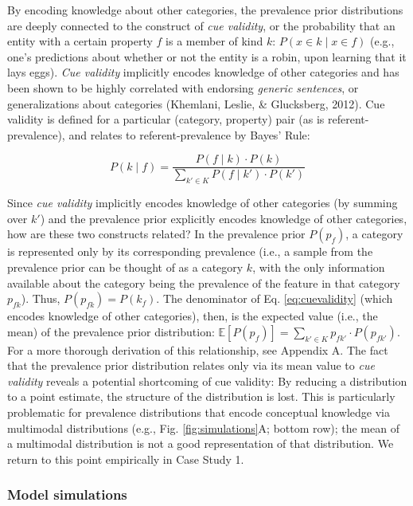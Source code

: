 \documentclass[english,floatsintext,man]{apa6}
\theoremstyle{definition}
\theoremstyle{definition}
\theoremstyle{definition}
\theoremstyle{remark}
\begin{document}
By encoding knowledge about other categories, the prevalence prior
distributions are deeply connected to the construct of \emph{cue
validity}, or the probability that an entity with a certain property
\(f\) is a member of kind \(k\): \(P(x \in k \mid x \in f)\) (e.g.,
one's predictions about whether or not the entity is a robin, upon
learning that it lays eggs). \emph{Cue validity} implicitly encodes
knowledge of other categories and has been shown to be highly correlated
with endorsing \emph{generic sentences}, or generalizations about
categories (Khemlani, Leslie, \& Glucksberg, 2012). Cue validity is
defined for a particular (category, property) pair (as is
referent-prevalence), and relates to referent-prevalence by Bayes' Rule:

\begin{equation}
P( k \mid  f) = \frac{P( f \mid  k) \cdot P( k)}{\sum\limits_{k' \in K} P( f \mid k') \cdot P( k')} \label{eq:cuevalidity}
\end{equation}

Since \emph{cue validity} implicitly encodes knowledge of other
categories (by summing over \(k'\)) and the prevalence prior explicitly
encodes knowledge of other categories, how are these two constructs
related? In the prevalence prior \(P(p_f)\), a category is represented
only by its corresponding prevalence (i.e., a sample from the prevalence
prior can be thought of as a category \(k\), with the only information
available about the category being the prevalence of the feature in that
category \(p_{fk}\)). Thus, \(P(p_{fk}) = P(k_{f})\). The denominator of
Eq. \ref{eq:cuevalidity} (which encodes knowledge of other categories),
then, is the expected value (i.e., the mean) of the prevalence prior
distribution:
\(\mathbb{E}[P(p_{f})] = \sum_{k' \in K} p_{fk'} \cdot P(p_{fk'} )\).
For a more thorough derivation of this relationship, see Appendix A. The
fact that the prevalence prior distribution relates only via its mean
value to \emph{cue validity} reveals a potential shortcoming of cue
validity: By reducing a distribution to a point estimate, the structure
of the distribution is lost. This is particularly problematic for
prevalence distributions that encode conceptual knowledge via multimodal
distributions (e.g., Fig. \ref{fig:simulations}A; bottom row); the mean
of a multimodal distribution is not a good representation of that
distribution. We return to this point empirically in Case Study 1.

\subsubsection{Model simulations}\label{model-simulations}
\end{document}
